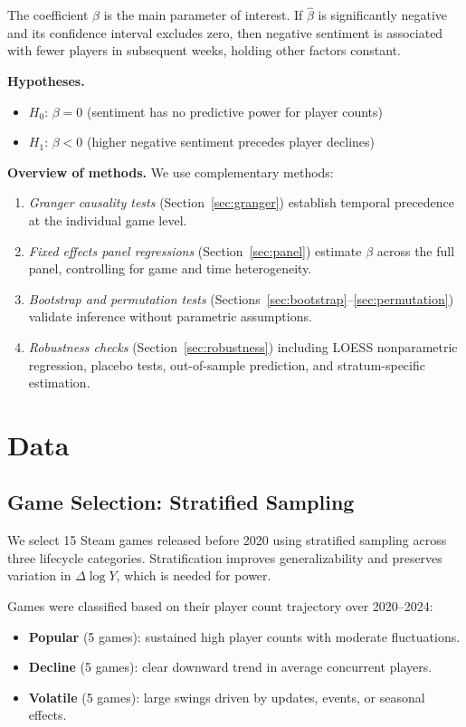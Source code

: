 \documentclass[11pt, letterpaper]{article}
\begin{document}
The coefficient $\beta$ is the main parameter of interest.
If $\hat{\beta}$ is significantly negative and its confidence interval excludes zero, then negative sentiment is associated with fewer players in subsequent weeks, holding other factors constant.

\medskip\noindent\textbf{Hypotheses.}
\begin{itemize}[nosep]
    \item $H_0$: $\beta = 0$ (sentiment has no predictive power for player counts)
    \item $H_1$: $\beta < 0$ (higher negative sentiment precedes player declines)
\end{itemize}

\medskip\noindent\textbf{Overview of methods.}
We use complementary methods:
\begin{enumerate}[nosep]
    \item \emph{Granger causality tests} (Section~\ref{sec:granger}) establish temporal precedence at the individual game level.
    \item \emph{Fixed effects panel regressions} (Section~\ref{sec:panel}) estimate $\beta$ across the full panel, controlling for game and time heterogeneity.
    \item \emph{Bootstrap and permutation tests} (Sections~\ref{sec:bootstrap}--\ref{sec:permutation}) validate inference without parametric assumptions.
    \item \emph{Robustness checks} (Section~\ref{sec:robustness}) including LOESS nonparametric regression, placebo tests, out-of-sample prediction, and stratum-specific estimation.
\end{enumerate}

\section{Data}\label{sec:data}

\subsection{Game Selection: Stratified Sampling}

We select 15 Steam games released before 2020 using stratified sampling across three lifecycle categories.
Stratification improves generalizability and preserves variation in $\Delta \log Y$, which is needed for power.

Games were classified based on their player count trajectory over 2020--2024:
\begin{itemize}[nosep]
    \item \textbf{Popular} (5 games): sustained high player counts with moderate fluctuations.
    \item \textbf{Decline} (5 games): clear downward trend in average concurrent players.
    \item \textbf{Volatile} (5 games): large swings driven by updates, events, or seasonal effects.
\end{itemize}
\end{document}
